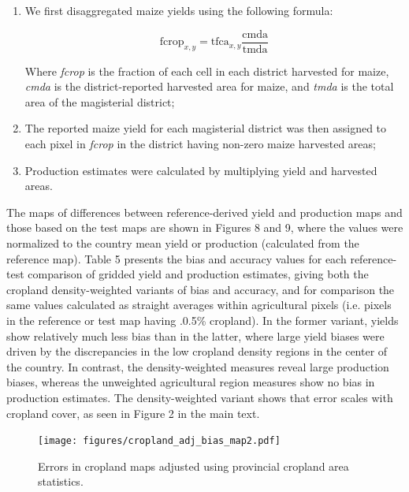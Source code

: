 \documentclass[11pt, titlepage]{article}
\begin{document}
\begin{enumerate}
  \item We first disaggregated maize yields using the following formula: 
  
  \begin{equation}
  \textrm{fcrop}_{x,y} = \textrm{tfca}_{x,y}\frac{\textrm{cmda}}{\textrm{tmda}}
  \end{equation}
  
  Where \emph{fcrop} is the fraction of each cell in each district harvested for maize, \emph{cmda} is the district-reported harvested area for maize, and \emph{tmda} is the total area of the magisterial district;
  \item The reported maize yield for each magisterial district was then assigned to each pixel in \emph{fcrop} in the district having non-zero maize harvested areas;
  \item Production estimates were calculated by multiplying yield and harvested areas.
\end{enumerate}

The maps of differences between reference-derived yield and production maps and those based on the test maps are shown in Figures 8 and 9, where the values were normalized to the country mean yield or production (calculated from the reference map).  Table 5 presents the bias and accuracy values for each reference-test comparison of gridded yield and production estimates, giving both the cropland density-weighted variants of bias and accuracy, and for comparison the same values calculated as straight averages within agricultural pixels (i.e. pixels in the reference or test map having $.$0.5\% cropland). In the former variant, yields show relatively much less bias than in the latter, where large yield biases were driven by the discrepancies in the low cropland density regions in the center of the country. In contrast, the density-weighted measures reveal large production biases, whereas the unweighted agricultural region measures show no bias in production estimates.  The density-weighted variant shows that error scales with cropland cover, as seen in Figure 2 in the main text. 

\begin{figure}[ht]
  \centering
     \texttt{[image: figures/cropland\_adj\_bias\_map2.pdf]} 
      \caption{Errors in cropland maps adjusted using provincial cropland area statistics.}
      \label{fig:default}
\end{figure}

\FloatBarrier

\end{document}
